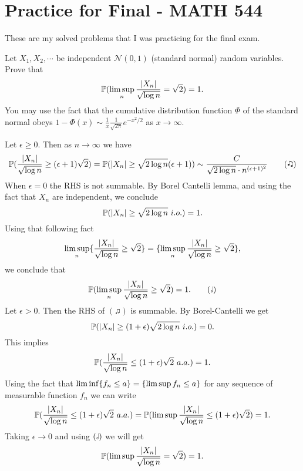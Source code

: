 \chapter{Practice for Final - MATH 544}

These are my solved problems that I was practicing for the final exam.

\begin{problem}
	Let $ X_1,X_2,\cdots $ be independent $ \mathcal{N}(0,1) $ (standard normal) random variables. Prove that
	\[ \mathbb{P}(\limsup_n \frac{|X_n|}{\sqrt{\log n}} = \sqrt{2}) = 1. \]
	You may use the fact that the cumulative distribution function $ \Phi $ of the standard normal obeys $ 1-\Phi(x) \sim \frac{1}{x}\frac{1}{\sqrt{2\pi}}e^{-x^2/2} $ as $ x\to \infty $.
\end{problem}
\begin{solution}
	Let $ \epsilon \geq 0 $. Then as $ n\to\infty $ we have
	\begin{align*}
		 \mathbb{P}(\frac{|X_n|}{\sqrt{\log n}} \geq (\epsilon+1)\sqrt{2}) = \mathbb{P}({|X_n|}\geq {\sqrt{2\log n}} (\epsilon+1)) \sim \frac{C}{\sqrt{2\log n} \cdot n^{(\epsilon+1)^2}} \tag{\twonotes}
	\end{align*}
	When $ \epsilon=0 $ the RHS is not summable. By Borel Cantelli lemma, and using the fact that $ X_n $ are independent, we conclude
	\[ \mathbb{P}(|X_n|\geq \sqrt{2\log n}\ i.o.) = 1. \]
	Using that following fact
	\[ \limsup_n \{\frac{|X_n|}{\sqrt{\log n}}\geq \sqrt{2}\} = \{\limsup_n \frac{|X_n|}{\sqrt{\log n}}\geq \sqrt{2}\}, \]
	we conclude that
	\[ \mathbb{P}({\limsup_n \frac{|X_n|}{\sqrt{\log n}}\geq \sqrt{2}}) = 1. \tag{\halfnote}\]
	Let $ \epsilon>0 $. Then the RHS of $ (\twonotes) $ is summable. By Borel-Cantelli we get
	\[ \prob(\abs{X_n}\geq (1+\epsilon)\sqrt{2\log n}\ i.o.) = 0.\]
	This implies
	\[ \mathbb{P}(\frac{|X_n|}{\sqrt{\log n}} \leq (1+\epsilon)\sqrt{2}\ a.a.) = 1. \]
	Using the fact that $ \liminf\{f_n \leq a\} = \{\limsup f_n \leq a\} $ for any sequence of measurable function $ f_n $ we can write 
	\[ \mathbb{P}(\frac{|X_n|}{\sqrt{\log n}} \leq (1+\epsilon)\sqrt{2}\ a.a.) = \mathbb{P}(\limsup \frac{|X_n|}{\sqrt{\log n}} \leq (1+\epsilon)\sqrt 2) = 1. \]
	Taking $ \epsilon \to 0 $ and using $ (\halfnote) $ we will get 
	\[ \mathbb{P}(\limsup\frac{|X_n|}{\sqrt{\log n}} = \sqrt{2}) = 1. \]
\end{solution}

